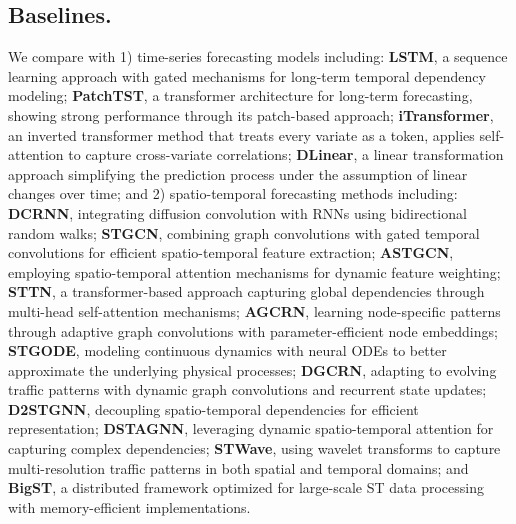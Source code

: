 \subsection{Baselines.}
\label{appx:baselines}
We compare \model with 1) time-series forecasting models including: \textbf{LSTM}\cite{hochreiter1997long}, a sequence learning approach with gated mechanisms for long-term temporal dependency modeling; \textbf{PatchTST}\cite{nie2022time}, a transformer architecture for long-term forecasting, showing strong performance through its patch-based approach; \textbf{iTransformer}\cite{liu2023itransformer}, an inverted transformer method that treats every variate as a token, applies self-attention to capture cross-variate correlations;
\textbf{DLinear}\cite{zeng2023transformers}, a linear transformation approach simplifying the prediction process under the assumption of linear changes over time;
and 2) spatio-temporal forecasting methods including: 
\textbf{DCRNN}\cite{li2017diffusion}, integrating diffusion convolution with RNNs using bidirectional random walks;
\textbf{STGCN}\cite{yu2017spatio}, combining graph convolutions with gated temporal convolutions for efficient spatio-temporal feature extraction;
\textbf{ASTGCN}\cite{guo2019attention}, employing spatio-temporal attention mechanisms for dynamic feature weighting;
\textbf{STTN}\cite{xu2020spatial}, a transformer-based approach capturing global dependencies through multi-head self-attention mechanisms;
\textbf{AGCRN}\cite{bai2020adaptive}, learning node-specific patterns through adaptive graph convolutions with parameter-efficient node embeddings;
\textbf{STGODE}\cite{fang2021spatial}, modeling continuous dynamics with neural ODEs to better approximate the underlying physical processes;
\textbf{DGCRN}\cite{li2023dynamic}, adapting to evolving traffic patterns with dynamic graph convolutions and recurrent state updates;
\textbf{D2STGNN}\cite{shao2022decoupled}, decoupling spatio-temporal dependencies for efficient representation;
\textbf{DSTAGNN}\cite{lan2022dstagnn}, leveraging dynamic spatio-temporal attention for capturing complex dependencies;
\textbf{STWave}\cite{fang2023spatio}, using wavelet transforms to capture multi-resolution traffic patterns in both spatial and temporal domains; and
\textbf{BigST}\cite{han2024bigst}, a distributed framework optimized for large-scale ST data processing with memory-efficient implementations.

